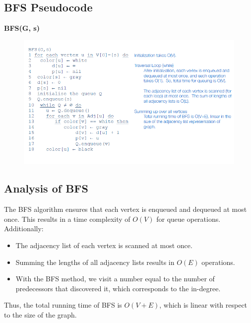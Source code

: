\subsection{BFS Pseudocode}
\textbf{BFS(G, s)}
\begin{figure}[h]
    \centering
\includegraphics[width=1\linewidth]{BFS Pseudo code.png}

\end{figure}

\subsection{Analysis of BFS}
The BFS algorithm ensures that each vertex is enqueued and dequeued at most once. This results in a time complexity of $O(V)$ for queue operations. Additionally:
\begin{itemize}
    \item The adjacency list of each vertex is scanned at most once.
    \item Summing the lengths of all adjacency lists results in $O(E)$ operations.
    \item With the BFS method, we visit a number equal to the number of predecessors that discovered it, which corresponds to the in-degree.
\end{itemize}
Thus, the total running time of BFS is $O(V + E)$, which is linear with respect to the size of the graph.

